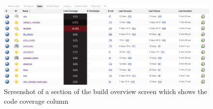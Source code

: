 \begin{figure}[htbp]
    \includegraphics[width=\textwidth]{graphics/jenkins-overview-coco.pdf}
    \caption{Screenshot of a section of the build overview screen which shows the code coverage column}
    \label{fig:jenkins-overview-coco}
\end{figure}
